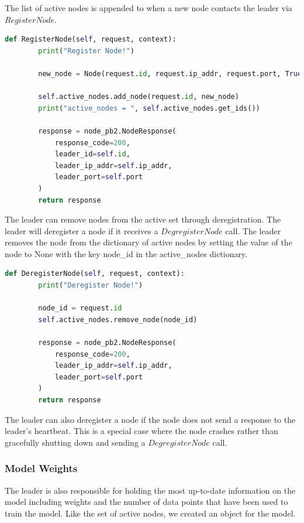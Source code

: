 \documentclass{article}
\begin{document}
The list of active nodes is appended to when a new node contacts the leader via $RegisterNode$. 

\begin{lstlisting}[language=Python]
    def RegisterNode(self, request, context):
        print("Register Node!")
        
        new_node = Node(request.id, request.ip_addr, request.port, True)

        self.active_nodes.add_node(request.id, new_node)
        print("active_nodes = ", self.active_nodes.get_ids())

        response = node_pb2.NodeResponse(
            response_code=200,
            leader_id=self.id,
            leader_ip_addr=self.ip_addr,
            leader_port=self.port
        )
        return response
\end{lstlisting}

The leader can remove nodes from the active set through deregistration. The leader will deregister a node if it receives a $DegregisterNode$ call. The leader removes the node from the dictionary of active nodes by setting the value of the node to None with the key node\_id in the active\_nodes dictionary. 

\begin{lstlisting}[language=Python]
    def DeregisterNode(self, request, context):
        print("Deregister Node!")
        
        node_id = request.id
        self.active_nodes.remove_node(node_id)

        response = node_pb2.NodeResponse(
            response_code=200,
            leader_ip_addr=self.ip_addr,
            leader_port=self.port
        )
        return response

\end{lstlisting}

The leader can also deregister a node if the node does not send a response to the leader's heartbeat. This is a special case where the node crashes rather than gracefully shutting down and sending a $DegregisterNode$ call. 


\subsubsection{Model Weights}
\label{sec:mw}
The leader is also responsible for holding the most up-to-date information on the model including weights and the number of data points that have been used to train the model. Like the set of active nodes, we created an object for the model.
\end{document}
